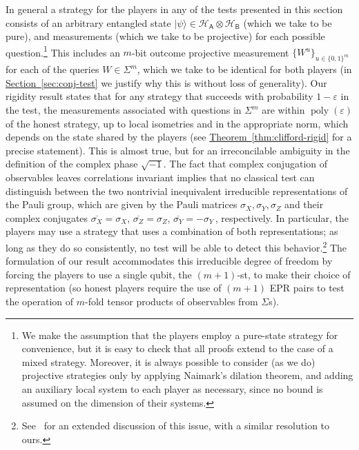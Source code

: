 \documentclass[11pt]{article}
\numberwithin{equation}{section}
\theoremstyle{definition}
\theoremstyle{plain}
\newcommand{\expref}[2]{\hyperref[#2]{#1~\ref{#2}}}
\newcommand{\ket}[1]{|#1\rangle}
\DeclareMathOperator{\poly}{poly}
\newcommand{\reg}[1]{{\textsf{#1}}}
\newcommand{\mH}{\mathcal{H}}
\newcommand{\eps}{\varepsilon}
\begin{document}
In general a strategy for the players in any of the tests presented in this section consists of an arbitrary entangled state $\ket{\psi} \in \mH_\reg{A} \otimes \mH_\reg{B}$ (which we take to be pure), and measurements (which we take to be projective) for each possible question.\footnote{We make the assumption that the players employ a pure-state strategy for convenience, but it is easy to check that all proofs extend to the case of a mixed strategy. Moreover, it is always possible to consider (as we do)  projective strategies only by applying Naimark's dilation theorem, and adding an auxiliary local system to each player as necessary, since no bound is assumed on the dimension of their systems.} This includes an $m$-bit outcome projective measurement $\{W^u\}_{u\in\{0,1\}^{m}}$ for each of the queries $W\in\Sigma^m$, which we take to be identical for both players (in \expref{Section}{sec:conj-test} we justify why this is without loss of generality). Our rigidity result states that for any strategy that succeeds with probability $1-\eps$ in the test, the measurements associated with questions in $\Sigma^m$ are within $\poly(\eps)$ of the honest strategy, up to local isometries and in the appropriate norm, which depends on the state shared by the players (see \expref{Theorem}{thm:clifford-rigid} for a precise statement). This is almost true, but for an irreconcilable ambiguity in the definition of the complex phase $\sqrt{-1}$. The fact that complex conjugation of observables 
leaves correlations invariant implies that no classical test can distinguish between the two nontrivial inequivalent irreducible representations of the Pauli group, which are given by the Pauli matrices $\sigma_X,\sigma_Y,\sigma_Z$ and their complex conjugates $\overline{\sigma_X}=\sigma_X$, $\overline{\sigma_Z}=\sigma_Z$, 
$\overline{\sigma_Y}=-\sigma_Y$\,, %
 respectively. In particular, the players may use a strategy that uses a combination of both representations; as long as they do so consistently, no test will be able to detect this behavior.\footnote{See~\cite[Appendix A]{reichardt2012classicalarxiv} for an extended discussion of this issue, with a similar resolution to ours.}  The formulation of our result accommodates this irreducible degree of freedom by forcing the players to use a single qubit, the $(m+1)$-st, to make their choice of representation (so honest players require the use of $(m+1)$ EPR pairs to test the operation of $m$-fold tensor products of observables from $\Sigma$s). 
\end{document}
